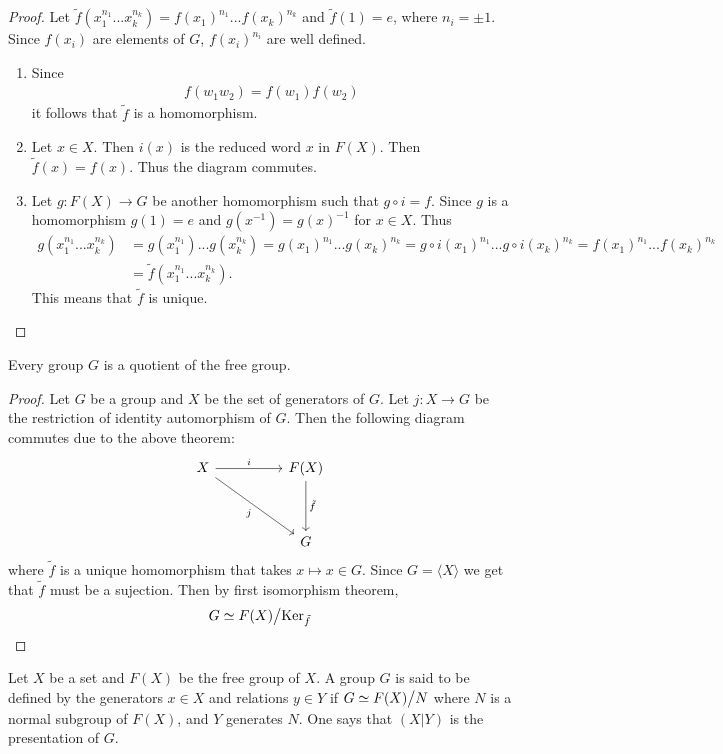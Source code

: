 \begin{proof}
  Let $\tilde{f}(x_1^{n_1}...x_k^{n_k}) = f(x_1)^{n_1}...f(x_k)^{n_k}$ and $\tilde{f}(1) = e$, where $n_i = \pm 1$. Since $f(x_i)$ are elements of $G$, $f(x_i)^{n_i}$ are well defined.
  \begin{enumerate}
    \item Since
      \begin{align*}
        f(w_1w_2) = f(w_1)f(w_2)
      \end{align*}
      it follows that $\tilde{f}$ is a homomorphism.
    \item Let $x\in X$. Then $i(x)$ is the reduced word $x$ in $F(X)$. Then $\tilde{f}(x) = f(x)$. Thus the diagram commutes.
    \item Let $g:F(X)\to G$ be another homomorphism such that $g\circ i = f$. Since $g$ is a homomorphism $g(1) = e$ and $g(x^{-1}) = g(x)^{-1}$ for $x\in X$. Thus
      \begin{align*}
        g(x_1^{n_1}...x_{k}^{n_k}) &= g(x_1^{n_1})...g(x_k^{n_k}) = g(x_1)^{n_1}...g(x_k)^{n_k} = g\circ i(x_1)^{n_1}...g\circ i(x_k)^{n_k} = f(x_1)^{n_1}...f(x_k)^{n_k}\\ &= \tilde{f}(x_1^{n_1}...x_k^{n_k}).
      \end{align*}
      This means that $\tilde{f}$ is unique.
  \end{enumerate}
\end{proof}
\begin{corollary}
  Every group $G$ is a quotient of the free group.
\end{corollary}
\begin{proof}
  Let $G$ be a group and $X$ be the set of generators of $G$. Let $j:X\to G$ be the restriction of identity automorphism of $G$. Then the following diagram commutes due to the above theorem:
  \[
    \begin{tikzcd}[sep=huge]
      X \arrow{r}{i} \arrow[swap]{dr}{j} & F(X) \arrow{d}{\tilde{f}} \\ & G 
    \end{tikzcd}
  \]
  where $\tilde{f}$ is a unique homomorphism that takes $x\mapsto x\in G$. Since $G=\langle X \rangle$ we get that $\tilde{f}$ must be a sujection. Then by first isomorphism theorem,
  \begin{align*}
    G \simeq F(X)\bign/\Ker_{\tilde{f}}
  \end{align*}
\end{proof}
\begin{definition}
  Let $X$ be a set and $F(X)$ be the free group of $X$. A group $G$ is said to be defined by the generators $x\in X$ and relations $y\in Y$ if $G\simeq F(X)\bign/N$ where $N$ is a normal subgroup of $F(X)$, and $Y$ generates $N$. One says that $(X|Y)$ is the presentation of $G$.
\end{definition}
